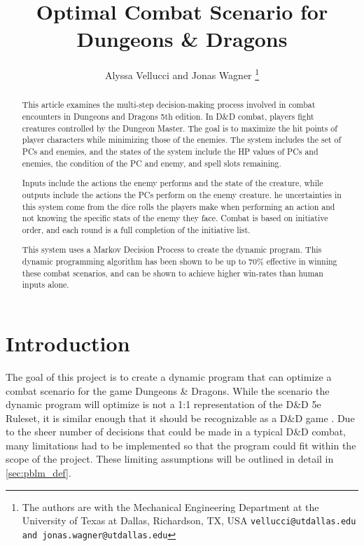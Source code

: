 \documentclass[letterpaper, 10 pt, conference]{ieeeconf}
\title{
    \LARGE \bf
    Optimal Combat Scenario for Dungeons \& Dragons
}
\author{
    Alyssa Vellucci and Jonas Wagner
    \thanks{
        The authors are with the Mechanical Engineering Department at the University of Texas at Dallas, Richardson, TX, USA 
    {\tt\small vellucci@utdallas.edu and jonas.wagner@utdallas.edu}
    }
}
\begin{document}
\maketitle
\begin{abstract}

    This article examines the multi-step decision-making process involved in combat encounters in Dungeons and Dragons 5th edition. 
    In D\&D combat, players fight creatures controlled by the Dungeon Master. 
    The goal is to maximize the hit points of player characters while minimizing those of the enemies. 
    The system includes the set of PCs and enemies, and the states of the system include the HP values of PCs and enemies, the condition of the PC and enemy, and spell slots remaining.

    Inputs include the actions the enemy performs and the state of the creature, while outputs include the actions the PCs perform on the enemy creature. 
    he uncertainties in this system come from the dice rolls the players make when performing an action and not knowing the specific stats of the enemy they face. 
    Combat is based on initiative order, and each round is a full completion of the initiative list.

    This system uses a Markov Decision Process to create the dynamic program.  
    This dynamic programming algorithm has been shown to be up to 70\% effective in winning these combat scenarios, and can be shown to achieve higher
    win-rates than human inputs alone.


\end{abstract}


\section{Introduction}
The goal of this project is to create a dynamic program that can optimize a combat scenario for the game Dungeons \& Dragons. 
While the scenario the dynamic program will 
optimize is not a 1:1 representation of the D\&D 5e Ruleset, it is similar enough that it should be recognizable as a D\&D game \cite{dnd5e, dnd_wizards, dnd_wiki}.
Due to the sheer number of decisions that could be made in a typical D\&D combat, many limitations had to be implemented so that the program could fit within the scope of the project. 
These limiting assumptions will be outlined
in detail in \cref{sec:pblm_def}. 
\end{document}
